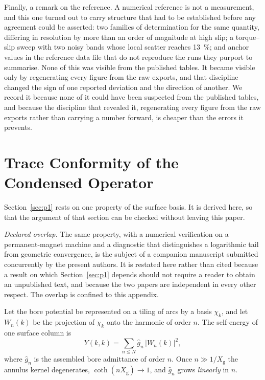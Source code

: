 \documentclass[10pt,a4paper,twocolumn]{article}
\newcommand{\Xg}{X_{\mathrm{g}}}
\theoremstyle{plain}
\theoremstyle{remark}
\begin{document}
Finally, a remark on the reference. A numerical reference is not a
measurement, and this one turned out to carry structure that had to be
established before any agreement could be asserted: two families of
determination for the same quantity, differing in resolution by more
than an order of magnitude at high slip; a torque--slip sweep with two
noisy bands whose local scatter reaches \SI{13}{\percent}; and anchor
values in the reference data file that do not reproduce the runs they
purport to summarise. None of this was visible from the published
tables. It became visible only by regenerating every figure from the
raw exports, and that discipline changed the sign of one reported
deviation and the direction of another. We record it because none of it could have been suspected from the
published tables, and because the discipline that revealed it, regenerating every figure from the raw exports rather than carrying a
number forward, is cheaper than the errors it prevents.


\appendix

\section{Trace Conformity of the Condensed Operator}
\label{app:trace}

Section~\ref{sec:p1} rests on one property of the surface basis. It is
derived here, so that the argument of that section can be checked
without leaving this paper.

\emph{Declared overlap.} The same property, with a numerical
verification on a permanent-magnet machine and a diagnostic that
distinguishes a logarithmic tail from geometric convergence, is the
subject of a companion manuscript submitted concurrently by the present
authors. It is restated here rather than cited because a result on which
Section~\ref{sec:p1} depends should not require a reader to obtain an
unpublished text, and because the two papers are independent in every
other respect. The overlap is confined to this appendix.

Let the bore potential be represented on a tiling of arcs by a basis
$\chi_k$, and let $W_n(k)$ be the projection of $\chi_k$ onto the
harmonic of order $n$. The self-energy of one surface column is
\begin{equation}
Y(k,k)=\sum_{n\le N}\hat{g}_n\,\bigl|W_n(k)\bigr|^{2},
\label{eq:app_energy}
\end{equation}
where $\hat{g}_n$ is the assembled bore admittance of order $n$. Once
$n\gg 1/\Xg$ the annulus kernel degenerates, $\coth(n\Xg)\to1$, and
$\hat{g}_n$ grows \emph{linearly} in $n$.
\end{document}

